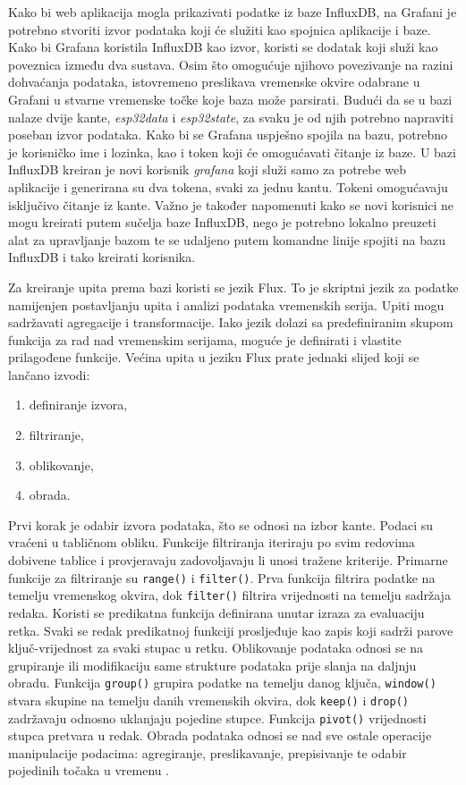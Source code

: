 Kako bi web aplikacija mogla prikazivati podatke iz baze InfluxDB, na Grafani je potrebno stvoriti izvor podataka koji će služiti kao spojnica aplikacije i baze. Kako bi Grafana koristila InfluxDB kao izvor, koristi se dodatak  koji služi kao poveznica između dva sustava. Osim što omogućuje njihovo povezivanje na razini dohvaćanja podataka, istovremeno preslikava vremenske okvire odabrane u Grafani u stvarne vremenske točke koje baza može parsirati. Budući da se u bazi nalaze dvije kante, \textit{esp32data} i \textit{esp32state}, za svaku je od njih potrebno napraviti poseban izvor podataka. Kako bi se Grafana uspješno spojila na bazu, potrebno je korisničko ime i lozinka, kao i token koji će omogućavati čitanje iz baze. U bazi InfluxDB kreiran je novi korisnik \textit{grafana} koji služi samo za potrebe web aplikacije i generirana su dva tokena, svaki za jednu kantu. Tokeni omogućavaju isključivo čitanje iz kante. Važno je također napomenuti kako se novi korisnici ne mogu kreirati putem sučelja baze InfluxDB, nego je potrebno lokalno preuzeti alat za upravljanje bazom te se udaljeno putem komandne linije spojiti na bazu InfluxDB i tako kreirati korisnika.

Za kreiranje upita prema bazi koristi se jezik Flux. To je skriptni jezik za podatke  namijenjen postavljanju upita i analizi podataka vremenskih serija. Upiti mogu sadržavati agregacije i transformacije. Iako jezik dolazi sa predefiniranim skupom funkcija za rad nad vremenskim serijama, moguće je definirati i vlastite prilagođene funkcije. Većina upita u jeziku Flux prate jednaki slijed koji se lančano izvodi:
\begin{enumerate}
	\item definiranje izvora,
	\item filtriranje,
	\item oblikovanje,
	\item obrada. 
\end{enumerate}

Prvi korak je odabir izvora podataka, što se odnosi na izbor kante. Podaci su vraćeni u tabličnom obliku. Funkcije filtriranja iteriraju po svim redovima dobivene tablice i provjeravaju zadovoljavaju li unosi tražene kriterije. Primarne funkcije za filtriranje su \lstinline|range()| i \lstinline|filter()|. Prva funkcija filtrira podatke na temelju vremenskog okvira, dok \lstinline|filter()| filtrira vrijednosti na temelju sadržaja redaka. Koristi se predikatna funkcija definirana unutar izraza za evaluaciju retka. Svaki se redak predikatnoj funkciji prosljeđuje kao zapis koji sadrži parove ključ-vrijednost za svaki stupac u retku. Oblikovanje podataka odnosi se na grupiranje ili modifikaciju same strukture podataka prije slanja na daljnju obradu. Funkcija \lstinline|group()| grupira podatke na temelju danog ključa, \lstinline|window()| stvara skupine na temelju danih vremenskih okvira, dok \lstinline|keep()| i \lstinline|drop()| zadržavaju odnosno uklanjaju pojedine stupce. Funkcija \lstinline|pivot()| vrijednosti stupca pretvara u redak. Obrada podataka odnosi se nad sve ostale operacije manipulacije podacima: agregiranje, preslikavanje, prepisivanje te odabir pojedinih točaka u vremenu \cite{influxdb}. 

